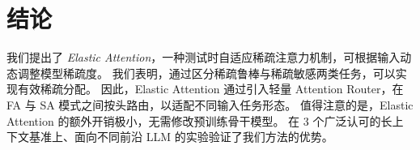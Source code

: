 \section{结论}
\label{sec:conclusion}
我们提出了 \emph{Elastic Attention}，一种测试时自适应稀疏注意力机制，可根据输入动态调整模型稀疏度。
我们表明，通过区分稀疏鲁棒与稀疏敏感两类任务，可以实现有效稀疏分配。
因此，Elastic Attention 通过引入轻量 Attention Router，在 FA 与 SA 模式之间按头路由，以适配不同输入任务形态。
值得注意的是，Elastic Attention 的额外开销极小，无需修改预训练骨干模型。
在 3 个广泛认可的长上下文基准上、面向不同前沿 LLM 的实验验证了我们方法的优势。
